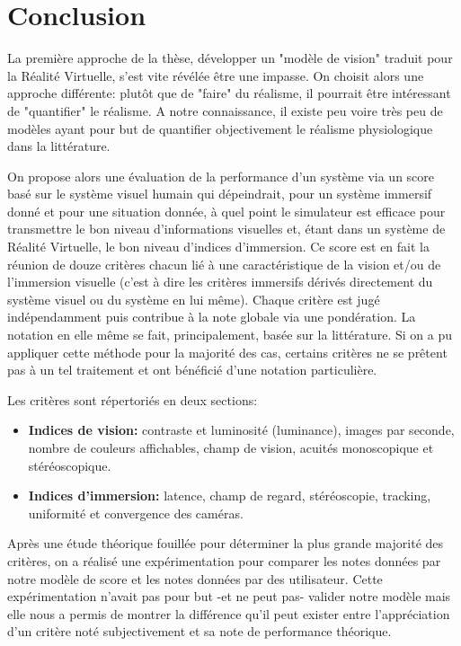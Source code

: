 \chapter*{Conclusion}
\par La première approche de la thèse, développer un "modèle de vision" traduit pour la Réalité Virtuelle, s'est vite révélée être une impasse. On choisit alors une approche différente: plutôt que de "faire" du réalisme, il pourrait être intéressant de "quantifier" le réalisme. A notre connaissance, il existe peu voire très peu de modèles ayant pour but de quantifier objectivement le réalisme physiologique dans la littérature.

\par On propose alors une évaluation de la performance d'un système via un score basé sur le système visuel humain qui dépeindrait, pour un système immersif donné et pour une situation donnée, à quel point le simulateur est efficace pour transmettre le bon niveau d'informations visuelles et, étant dans un système de Réalité Virtuelle, le bon niveau d'indices d'immersion. Ce score est en fait la réunion de douze critères chacun lié à une caractéristique de la vision et/ou de l'immersion visuelle (c'est à dire les critères immersifs dérivés directement du système visuel ou du système en lui même). Chaque critère est jugé indépendamment puis contribue à la note globale via une pondération. La notation en elle même se fait, principalement, basée sur la littérature. Si on a pu appliquer cette méthode pour la majorité des cas, certains critères ne se prêtent pas à un tel traitement et ont bénéficié d'une notation particulière.

\par Les critères sont répertoriés en deux sections:
	
\begin{itemize}\itemsep12pt
	\item \textbf{Indices de vision:} contraste et luminosité (luminance), images par seconde, nombre de couleurs affichables, champ de vision, acuités monoscopique et stéréoscopique.
	\item \textbf{Indices d'immersion:} latence, champ de regard, stéréoscopie, tracking, uniformité et convergence des caméras.
\end{itemize}
	
\par Après une étude théorique fouillée pour déterminer la plus grande majorité des critères, on a réalisé une expérimentation pour comparer les notes données par notre modèle de score et les notes données par des utilisateur. Cette expérimentation n'avait pas pour but -et ne peut pas- valider notre modèle mais elle nous a permis de montrer la différence qu'il peut exister entre l'appréciation d'un critère noté subjectivement et sa note de performance théorique.

